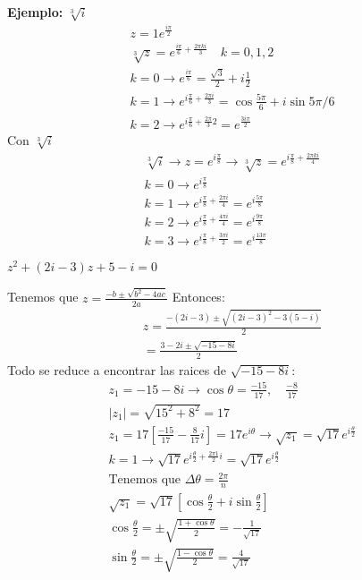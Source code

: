 \documentclass{article}
\newcommand{\caja}[3]{%
  \begin{tcolorbox}[colback=#1!5!white,colframe=#1!25!black,title=#2]
    #3
  \end{tcolorbox}%
}
\begin{document}
\textbf{Ejemplo: } $ \sqrt[3]{i }   $
\begin{gather}
   z = 1e ^ {\frac{i\pi}{2} }\\
   \sqrt[3]{z } = e ^ {\frac{i\pi}{6}+ \frac{2\pi k i}{3}  } \quad k = 0,1,2\\
   k = 0 \rightarrow e ^ {\frac{i \pi }{6} } = \frac{\sqrt{3}  }{2} + i \frac{1}{2}\\
   k = 1 \rightarrow e ^ {i \frac{\pi}{6} + \frac{2 \pi i }{3}  } = \cos{\frac{5\pi}{6} } + i \sin{5\pi/6} \\
   k = 2 \rightarrow e ^ {i \frac{\pi}{6}+ \frac{2\pi}{3}2   } = e ^ {\frac{3i \pi}{2} } 
\end{gather}
Con $ \sqrt[3]{i}   $
\begin{gather}
   \sqrt[3]{i} \rightarrow z = e ^ {i \frac{\pi }{8 } } \rightarrow \sqrt[3]{z} =  e ^ {i \frac{\pi }{8 }  + \frac{2 \pi k i}{4} }\\
   k = 0 \rightarrow  e ^ {i \frac{\pi }{8 } }\\
   k = 1 \rightarrow  e ^ {i \frac{\pi }{8 }  + \frac{2 \pi  i}{4} } = e ^ {i \frac{5\pi}{8 } }\\
   k = 2 \rightarrow  e ^ {i \frac{\pi }{8 }  + \frac{4 \pi  i}{4} } = e ^ {i \frac{9\pi}{8 } }\\
   k = 3 \rightarrow e ^ {i \frac{\pi }{8 }  + \frac{3 \pi  i}{2} } = e ^ {i \frac{13\pi}{8 } } 
\end{gather}

\caja{black}{Ejemplo polinomio}{
  $ z^2+(2i-3)z + 5 -i  =0  $

  Tenemos que $ z = \frac{-b \pm \sqrt{b ^ {2 }-4ac }  }{2a }  $ Entonces:
  \begin{gather}
    z = \frac{-(2i-3 ) \pm \sqrt{(2i-3)^ {2 } - 3(5-i )}  }{2}\\
    = \frac{3-2i\pm \sqrt{-15-8i }  }{2}   
    \label{eq:ejemplo_polinomio_complejo}
  \end{gather}
  Todo se reduce a encontrar las raices de $ \sqrt{-15-8i } $:
  \begin{gather}
     z_1 = -15-8i \rightarrow \cos{\theta}=\frac{-15 }{17},\quad \frac{-8 }{17}     \\
     |z_1| = \sqrt{15 ^ {2 }+8 ^ {2 }} = 17\\
     z_1 = 17[\frac{-15 }{17 }- \frac{8 }{17}i   ] = 17e ^ {i\theta }\rightarrow \sqrt{z_1 } = \sqrt{17 } e ^ {i \frac{\theta }{2} }\\
     k = 1 \rightarrow  \sqrt{17 } e ^ {i \frac{\theta }{2} + \frac{2\pi 1 }{2}i } = \sqrt{17 } e ^ {i \frac{\theta }{2} } \\
     \text{Tenemos que } \Delta \theta = \frac{2\pi}{n }\\  
     \sqrt{z_1 } = \sqrt{17 } [\cos{\frac{\theta }{2} } + i \sin{\frac{\theta }{2} }   ] \\
     \cos{\frac{\theta }{2} } = \pm \sqrt{\frac{1+ \cos{\theta}  }{2} } = - \frac{1}{\sqrt{17 }  }\\
     \sin{\frac{\theta }{2} } = \pm \sqrt{\frac{1-\cos{\theta}  }{2} } =  \frac{4}{\sqrt{17}  }   
  \end{gather}
}
\end{document}
